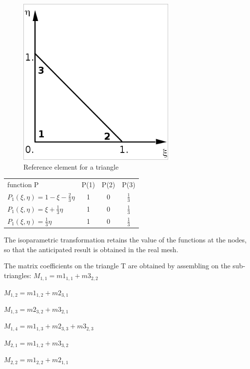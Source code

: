 \begin{figure}[H]%
\begin{center}
%
  \includegraphics[width=0.7\textwidth]{./graphics/ref-triangle}
%
\end{center}
\caption{Reference element for a triangle}
\label{fig:reftriangle}
\end{figure}

\begin{tabular}{lccc}
function P & P(1) & P(2) &  P(3) \\
  $P_{1}(\xi,\eta) = 1 - \xi - \frac{2}{3} \eta$ & 1 & 0 & $\frac{1}{3}$ \\
  $P_{1}(\xi,\eta) = \xi + \frac{1}{3} \eta$ & 1 & 0 & $\frac{1}{3}$ \\
  $P_{1}(\xi,\eta) = \frac{1}{3} \eta$ & 1 & 0 & $\frac{1}{3}$
\end{tabular}

The isoparametric transformation retains the value of the functions at the
nodes, so that the anticipated result is obtained in the real mesh.

The matrix coefficients on the triangle T are obtained by assembling on the
sub-triangles:
$M_{1,1} = m1_{1,1} + m3_{2,2}$

$M_{1,2} = m1_{1,2} + m2_{3,1}$

$M_{1,3} = m2_{3,2} + m3_{2,1}$

$M_{1,4} = m1_{1,3} + m2_{3,3} + m3_{2,3}$

$M_{2,1} = m1_{1,2} + m3_{3,2}$

$M_{2,2} = m1_{2,2} + m2_{1,1}$

